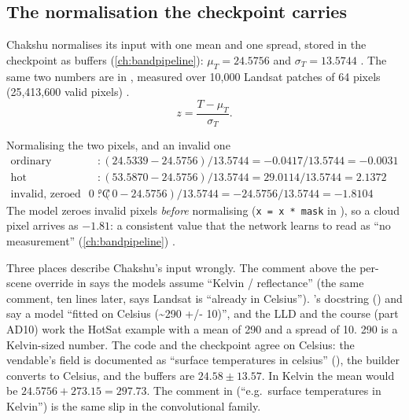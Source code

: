 \subsection{The normalisation the checkpoint carries}

Chakshu normalises its input with one mean and one spread, stored in the checkpoint as buffers
(\cref{ch:bandpipeline}): $\mu_T=24.5756$ and $\sigma_T=13.5744$ . The same two numbers are in , measured over
10,000 Landsat patches of 64 pixels (25,413,600 valid pixels) .
\begin{equation}\label{eq:chakshu:z}
z = \frac{T-\mu_T}{\sigma_T} .
\end{equation}

\begin{worked}[label={we:chakshu:z}]{Normalising the two pixels, and an invalid one}
\begin{align*}
\text{ordinary} &: (24.5339-24.5756)/13.5744 = -0.0417/13.5744 = -0.0031\\
\text{hot} &: (53.5870-24.5756)/13.5744 = 29.0114/13.5744 = 2.1372\\
\text{invalid, zeroed to } 0\text{ °C} &: (0-24.5756)/13.5744 = -24.5756/13.5744 = -1.8104
\end{align*}
The model zeroes invalid pixels \emph{before} normalising (\lstinline!x = x * mask! in ),
so a cloud pixel arrives as $-1.81$: a consistent value that the network learns to read as ``no measurement''
(\cref{ch:bandpipeline}) \tagC.
\end{worked}

\begin{sourcenote}
Three places describe Chakshu's input wrongly. The comment above the per-scene override in
 says the models assume ``Kelvin / reflectance'' (the same
comment, ten lines later, says Landsat is ``already in Celsius''). 's docstring
() and  say a model ``fitted on Celsius
(\textasciitilde290 +/- 10)'', and the LLD and the course (part AD10) work the HotSat example with a mean of 290 and
a spread of 10. 290 is a Kelvin-sized number. The code and the checkpoint agree on Celsius: the vendable's field is
documented as ``surface temperatures in celsius'' (), the builder converts to
Celsius, and the buffers are $24.58\pm13.57$. In Kelvin the mean would be $24.5756+273.15=297.73$.
The comment in  (``e.g.\ surface temperatures in Kelvin'') is the same slip in
the convolutional family.
\end{sourcenote}

